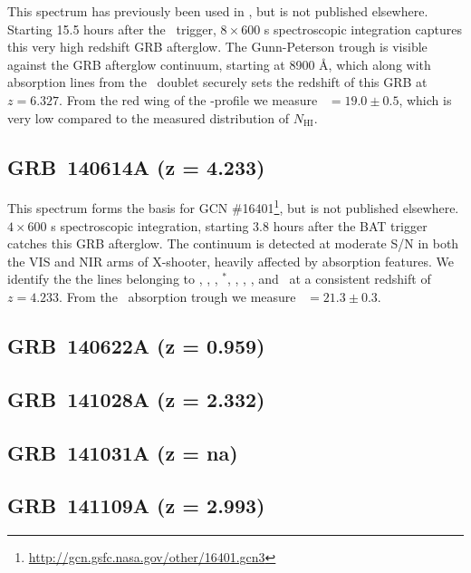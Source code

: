 \documentclass{aa}    %
\begin{document}
This spectrum has previously been used in \citet{Melandri2015}, but is not
published elsewhere. Starting 15.5 hours after the \swift~trigger, $8\times600$
s spectroscopic integration captures this very high redshift GRB afterglow. The
Gunn-Peterson trough is visible against the GRB afterglow continuum, starting at
8900 \AA, which along with absorption lines from the \mgii~doublet securely sets
the redshift of this GRB at $z = 6.327$. From the red wing of the \lya-profile
we measure \nh~$=19.0 \pm 0.5$, which is very low compared to the measured
distribution of $N_{\mathrm{HI}}$.

\subsection{GRB~140614A (z = 4.233)}	

This spectrum forms the basis for GCN
\#16401\footnote{\url{http://gcn.gsfc.nasa.gov/other/16401.gcn3}}, but is not
published elsewhere. $4\times600$ s spectroscopic integration, starting 3.8
hours after the BAT trigger catches this GRB afterglow. The continuum is
detected at moderate S/N in both the VIS and NIR arms of X-shooter, heavily
affected by absorption features. We identify the the lines belonging to \lya,
\SIii, \cii, \cii$^*$, \alii, \aliii, \feii, and \mgii~at a consistent redshift
of $z = 4.233$. From the \lya~absorption trough we measure \nh~$=21.3 \pm 0.3$.

\subsection{GRB~140622A (z = 0.959)}	



\subsection{GRB~141028A (z = 2.332)}	



\subsection{GRB~141031A  (z = na)}	



\subsection{GRB~141109A (z = 2.993)}	
\end{document}
